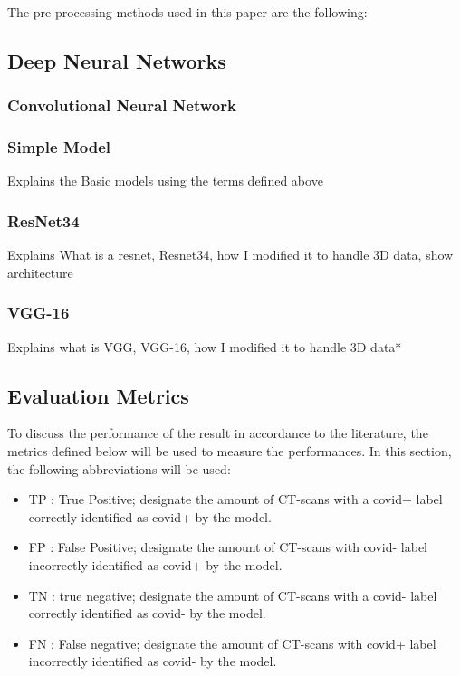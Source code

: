 \documentclass[12pt, letterpaper]{article}
\begin{document}
The pre-processing methods used in this paper are the following:


\subsection{Deep Neural Networks}
\subsubsection{Convolutional Neural Network}

\subsubsection{Simple Model}
Explains the Basic models using the terms defined above
\subsubsection{ResNet34}
Explains What is a resnet, Resnet34, how I modified it to handle 3D data, show architecture
\subsubsection{VGG-16}
Explains what is VGG, VGG-16, how I modified it to handle 3D data*

\subsection{Evaluation Metrics}
To discuss the performance of the result in accordance to the literature, the metrics defined below will be used to measure the performances. In this section, the following abbreviations will be used: 
\begin{itemize}
    \item TP : True Positive; designate the amount of CT-scans with a covid+ label correctly identified as covid+ by the model.
    \item FP : False Positive; designate the amount of CT-scans with covid- label incorrectly identified as covid+ by the model.
    \item TN : true negative; designate the amount of CT-scans with a covid- label correctly identified as covid- by the model.
    \item FN : False negative; designate the amount of CT-scans with covid+ label incorrectly identified as covid- by the model.
\end{itemize}
\end{document}
